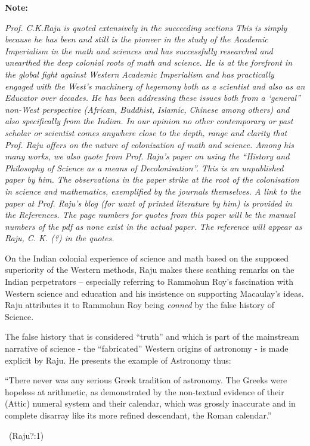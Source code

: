 \vskip 4pt

\textbf{Note:}

\vskip 4pt

\textit{Prof. C.K.Raju is quoted extensively in the succeeding sections This is simply because he has been and still is the pioneer in the study of the Academic Imperialism in the math and sciences and has successfully researched and unearthed the deep colonial roots of math and science. He is at the forefront in the global fight against Western Academic Imperialism and has practically engaged with the West’s machinery of hegemony both as a scientist and also as an Educator over decades. He has been addressing these issues both from a ‘general” non-West perspective (African, Buddhist, Islamic, Chinese among others) and also specifically from the Indian. In our opinion no other contemporary or past scholar or scientist comes anywhere close to the depth, range and clarity that Prof. Raju offers on the nature of colonization of math and science. Among his many works, we also quote from Prof. Raju’s paper on using the “History and Philosophy of Science as a means of Decolonisation”. This is an unpublished paper by him. The observations in the paper strike at the root of the colonisation in science and mathematics, exemplified by the journals themselves. A link to the paper at Prof. Raju’s blog (for want of printed literature by him) is provided in the References. The page numbers for quotes from this paper will be the manual numbers of the pdf as none exist in the actual paper. The reference will appear as Raju, C. K. (?) in the quotes.}

\vskip 3pt

On the Indian colonial experience of science and math based on the supposed superiority of the Western methods, Raju makes these scathing remarks on the Indian perpetrators – especially referring to Rammohun Roy’s fascination with Western science and education and his insistence on supporting Macaulay’s ideas. Raju attributes it to Rammohun Roy being \textit{conned} by the false history of Science.

The false history that is considered “truth” and which is part of the mainstream narrative of science - the “fabricated” Western origins of astronomy - is made explicit by Raju. He presents the example of Astronomy thus:

\begin{myquote}
“There never was any serious Greek tradition of astronomy. The Greeks were hopeless at arithmetic, as demonstrated by the non-textual evidence of their (Attic) numeral system and their calendar, which was grossly inaccurate and in complete disarray like its more refined descendant, the Roman calendar.” 

\vskip -6pt

~\hfill (Raju?:1)
\end{myquote}

